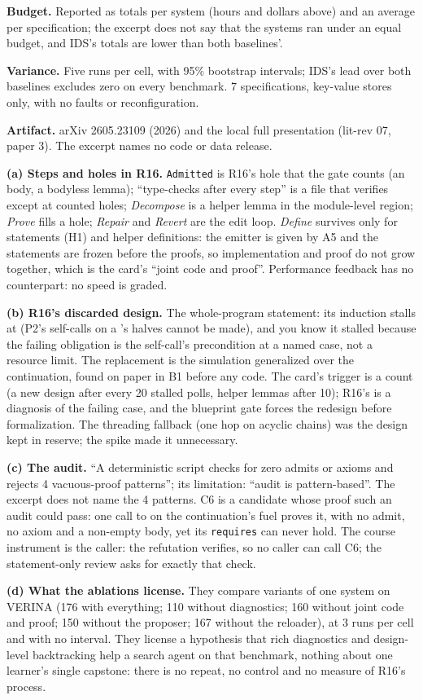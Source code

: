 \documentclass[11pt]{article}
\begin{document}
\begin{answer}
\textbf{Budget.} Reported as totals per system (hours and dollars above) and
an average per specification; the excerpt does not say that the systems ran
under an equal budget, and IDS's totals are lower than both baselines'.

\textbf{Variance.} Five runs per cell, with 95\% bootstrap intervals; IDS's
lead over both baselines excludes zero on every benchmark. 7 specifications,
key-value stores only, with no faults or reconfiguration.

\textbf{Artifact.} arXiv 2605.23109 (2026) and the local full presentation
(lit-rev 07, paper 3). The excerpt names no code or data release.

\textbf{(a) Steps and holes in R16.} \texttt{Admitted} is R16's hole that the
gate counts (an  body, a bodyless lemma); ``type-checks after
every step'' is a file that verifies except at counted holes; \emph{Decompose}
is a helper lemma in the module-level region; \emph{Prove} fills a hole;
\emph{Repair} and \emph{Revert} are the edit loop. \emph{Define} survives only
for statements (H1) and helper definitions: the emitter is given by A5 and the
statements are frozen before the proofs, so implementation and proof do not
grow together, which is the card's ``joint code and proof''. Performance
feedback has no counterpart: no speed is graded.

\textbf{(b) R16's discarded design.} The whole-program statement: its
induction stalls at  (P2's self-calls on a 's halves cannot
be made), and you know it stalled because the failing obligation is the
self-call's precondition at a named case, not a resource limit. The
replacement is the simulation generalized over the continuation, found on
paper in B1 before any code. The card's trigger is a count (a new design after
every 20 stalled polls, helper lemmas after 10); R16's is a diagnosis of the
failing case, and the blueprint gate forces the redesign before
formalization. The threading fallback (one hop on acyclic chains) was the
design kept in reserve; the spike made it unnecessary.

\textbf{(c) The audit.} ``A deterministic script checks for zero admits or
axioms and rejects 4 vacuous-proof patterns''; its limitation: ``audit is
pattern-based''. The excerpt does not name the 4 patterns. C6 is a candidate
whose proof such an audit could pass: one call to  on the
continuation's fuel proves it, with no admit, no axiom and a non-empty body,
yet its \texttt{requires} can never hold. The course instrument is the caller:
the refutation  verifies, so no caller can call
C6; the statement-only review asks for exactly that check.

\textbf{(d) What the ablations license.} They compare variants of one system
on VERINA (176 with everything; 110 without diagnostics; 160 without joint code
and proof; 150 without the proposer; 167 without the reloader), at 3 runs per
cell and with no interval. They license a hypothesis that rich diagnostics and
design-level backtracking help a search agent on that benchmark, nothing about
one learner's single capstone: there is no repeat, no control and no measure of
R16's process.
\end{answer}
\end{document}
